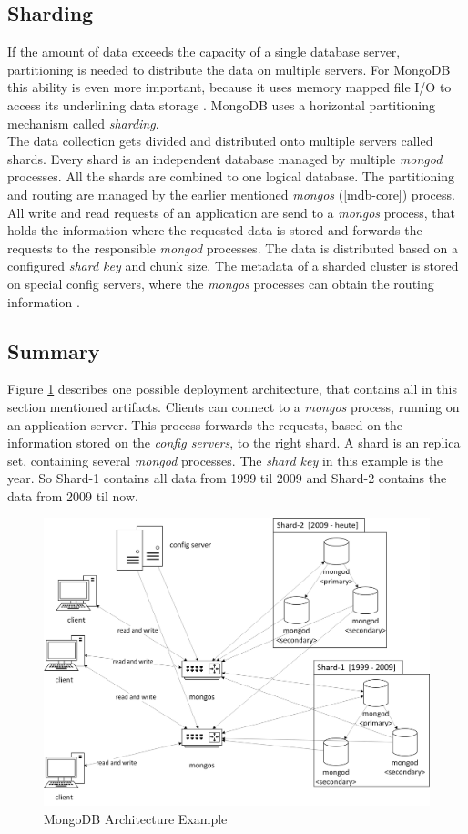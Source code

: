 \subsection{Sharding}\label{mdb-sharding}
If the amount of data exceeds the capacity of a single database server, partitioning is needed to distribute the data on multiple servers. For MongoDB this ability is even more important, because it uses memory mapped file I/O to access its underlining data storage \cite{Hows2013}. MongoDB uses a horizontal partitioning mechanism called \textit{sharding}.\\
The data collection gets divided and distributed onto multiple servers called shards. Every shard is an independent database managed by multiple \textit{mongod} processes. All the shards are combined to one logical database. The partitioning and routing are managed by the earlier mentioned \textit{mongos} (\ref{mdb-core}) process. All write and read requests of an application are send to a \textit{mongos} process, that holds the information where the requested data is stored and forwards the requests to the responsible \textit{mongod} processes. The data is distributed based on a configured \textit{shard key} and chunk size. The metadata of a sharded cluster is stored on special config servers, where the \textit{mongos} processes can obtain the routing information \cite{Edward2015,Hows2013}.

\subsection{Summary}
Figure \ref{arch-example} describes one possible deployment architecture, that contains all in this section mentioned artifacts. Clients can connect to a \textit{mongos} process, running on an application server. This process forwards the requests, based on the information stored on the \textit{config servers}, to the right shard. A shard is an replica set, containing several \textit{mongod} processes. The \textit{shard key} in this example is the year. So Shard-1 contains all data from 1999 til 2009 and Shard-2 contains the data from 2009 til now. 
\begin{figure}[H]
\includegraphics[width=\linewidth,keepaspectratio]{images/sharding.png}
\caption{MongoDB Architecture Example}
\label{arch-example}
\end{figure}
